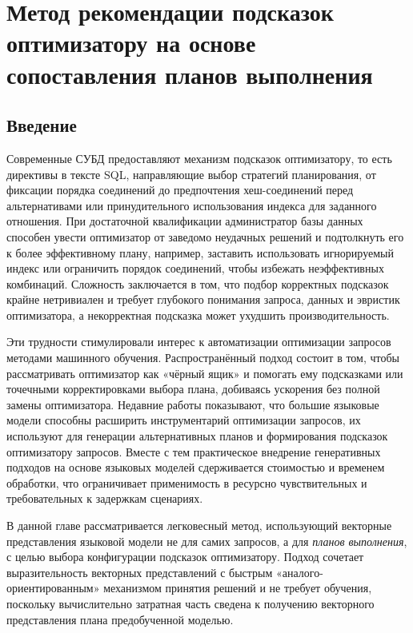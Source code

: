 
\chapter{Метод рекомендации подсказок оптимизатору на основе сопоставления планов выполнения}\label{ch:ch3}
\section{Введение}

Современные СУБД предоставляют механизм подсказок оптимизатору, то есть директивы в тексте SQL, направляющие выбор стратегий планирования, от фиксации порядка соединений до предпочтения хеш-соединений перед альтернативами или принудительного использования индекса для заданного отношения. При достаточной квалификации администратор базы данных способен увести оптимизатор от заведомо неудачных решений и подтолкнуть его к более эффективному плану, например, заставить использовать игнорируемый индекс или ограничить порядок соединений, чтобы избежать неэффективных комбинаций. Сложность заключается в том, что подбор корректных подсказок крайне нетривиален и требует глубокого понимания запроса, данных и эвристик оптимизатора, а некорректная подсказка может ухудшить производительность.

Эти трудности стимулировали интерес к автоматизации оптимизации запросов методами машинного обучения. Распространённый подход состоит в том, чтобы рассматривать оптимизатор как «чёрный ящик» и помогать ему подсказками или точечными корректировками выбора плана, добиваясь ускорения без полной замены оптимизатора. Недавние работы показывают, что большие языковые модели способны расширить инструментарий оптимизации запросов, их используют для генерации альтернативных планов и формирования подсказок оптимизатору запросов. Вместе с тем практическое внедрение генеративных подходов на основе языковых моделей сдерживается стоимостью и временем обработки, что ограничивает применимость в ресурсно чувствительных и требовательных к задержкам сценариях.

В данной главе рассматривается легковесный метод, использующий векторные представления языковой модели не для самих запросов, а для \emph{планов выполнения}, с целью выбора конфигурации подсказок оптимизатору. Подход сочетает выразительность векторных представлений с быстрым «аналого-ориентированным» механизмом принятия решений и не требует обучения, поскольку вычислительно затратная часть сведена к получению векторного представления плана предобученной моделью.

